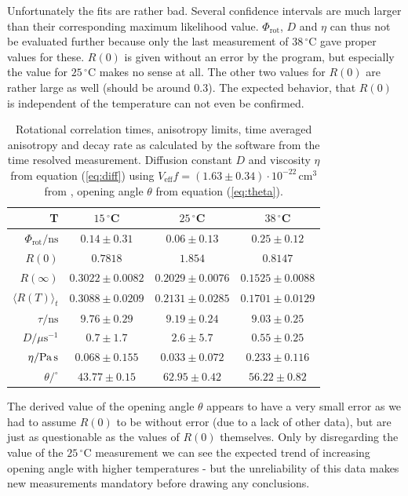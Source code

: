 \documentclass{scrartcl}
\numberwithin{equation}{section}
\numberwithin{figure}{section}
\numberwithin{table}{section}
\begin{document}
Unfortunately the fits are rather bad. Several confidence intervals are much larger than their corresponding maximum likelihood value. $\Phi_\text{rot}$, $D$ and $\eta$ can thus not be evaluated further because only the last measurement of $38\,^\circ$C gave proper values for these. $R(0)$ is given without an error by the program, but especially the value for $25\,^\circ$C makes no sense at all. The other two values for $R(0)$ are rather large as well (should be around $0.3$). The expected behavior, that $R(0)$ is independent of the temperature can not even be confirmed.

\begin{table}
\centering
{}
\begin{tabular}{r|ccc}
T & $15\,^\circ$C & $25\,^\circ$C & $38\,^\circ$C \\
\hline
\hline
$\Phi_\text{rot} / \text{ns}$ & $0.14\pm 0.31$ & $0.06\pm 0.13$ & $0.25\pm 0.12$ \\
$R(0)$ & $0.7818$ & $1.854$ & $0.8147$ \\
$R(\infty)$ & $0.3022\pm 0.0082$ & $0.2029 \pm 0.0076$ & $0.1525 \pm 0.0088$ \\
$\langle R(T) \rangle_t$ & $0.3088\pm 0.0209$ & $0.2131\pm 0.0285$ & $0.1701\pm 0.0129$ \\
$\tau / \text{ns}$ & $9.76\pm 0.29$ & $9.19\pm 0.24$ & $9.03\pm 0.25$ \\
\hline
\hline
$D / \mu\text{s}^{-1}$ & $0.7\pm 1.7$ & $2.6\pm 5.7$ & $0.55\pm 0.25$ \\
$\eta / \text{Pa\,s}$ & $0.068\pm 0.155$ & $0.033\pm 0.072$ & $0.233\pm 0.116$ \\
$\theta / ^\circ$ & $43.77\pm 0.15$ & $62.95\pm 0.42$ & $56.22\pm 0.82$ \\
\end{tabular}
\caption{\small Rotational correlation times, anisotropy limits, time averaged anisotropy and decay rate as calculated by the software from the time resolved measurement. Diffusion constant $D$ and viscosity $\eta$ from equation (\ref{eq:diff}) using $V_\text{eff} f = (1.63\pm 0.34)\cdot 10^{-22}\,\text{cm}^3$ from \cite{heyn}, opening angle $\theta$ from equation (\ref{eq:theta}).  }
\label{tab:bla}
\end{table}

The derived value of the opening angle $\theta$ appears to have a very small error as we had to assume $R(0)$ to be without error (due to a lack of other data), but are just as questionable as the values of $R(0)$ themselves. Only by disregarding the value of the $25\,^\circ$C measurement we can see the expected trend of increasing opening angle with higher temperatures - but the unreliability of this data makes new measurements mandatory before drawing any conclusions.
\end{document}
